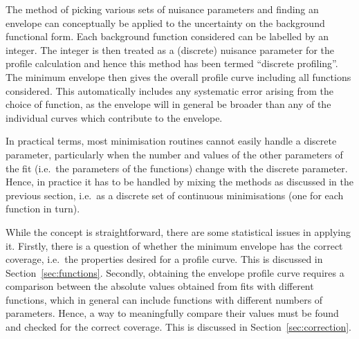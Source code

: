 The method of picking various sets of nuisance parameters and finding
an envelope can conceptually be applied to the uncertainty on the background functional form.
Each background function considered can be labelled by an
integer. The integer is then treated as a (discrete) nuisance parameter
for the profile calculation and hence this method has been termed
``discrete profiling''.
The minimum envelope then gives the overall profile curve including
all functions considered. This automatically includes any systematic error
arising from the choice of function, as the envelope will in general be broader
than any of the individual curves which contribute to the envelope.

In practical terms, most minimisation routines
cannot easily handle a discrete parameter, particularly when the
number and values of the other parameters of the fit (i.e.~the parameters
of the functions) change with the discrete parameter.
Hence, in practice it has
to be handled by mixing the methods as discussed in the previous section,
i.e.~as a discrete set of continuous minimisations (one for each function in turn).

While the concept is straightforward, there are some statistical
issues in applying it.
Firstly, there is a question of whether the \nll minimum envelope has the correct coverage,
i.e.~the properties desired for a profile curve.
This is discussed in Section~\ref{sec:functions}.
Secondly, obtaining the envelope profile curve requires a
comparison between the absolute \nll values obtained from fits with different functions, which
in general can include functions with different numbers of parameters.
Hence, a way to meaningfully compare their \nll values must be found and checked for the correct coverage.
This is discussed in Section~\ref{sec:correction}.
